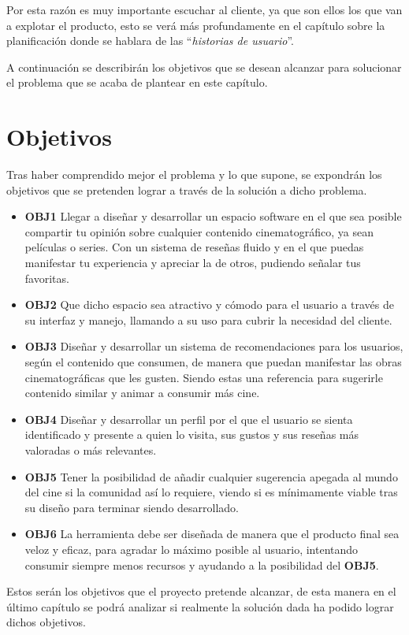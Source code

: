 Por esta razón es muy importante escuchar al cliente, ya que son ellos los que van a explotar el 
producto, esto se verá más profundamente en el capítulo sobre la planificación donde se hablara de las 
``\textit{historias de usuario}''.

A continuación se describirán los objetivos que se desean alcanzar para solucionar el problema que se 
acaba de plantear en este capítulo.

\section{Objetivos}

Tras haber comprendido mejor el problema y lo que supone, se expondrán los objetivos que se pretenden 
lograr a través de la solución a dicho problema.

\begin{itemize}
    \item \textbf{OBJ1} Llegar a diseñar y desarrollar un espacio software en el que sea posible 
    compartir tu opinión sobre cualquier contenido cinematográfico, ya sean películas o series. Con un 
    sistema de reseñas fluido y en el que puedas manifestar tu experiencia y apreciar la de otros, 
    pudiendo señalar tus favoritas.
    \item \textbf{OBJ2} Que dicho espacio sea atractivo y cómodo para el usuario a través de su interfaz 
    y manejo, llamando a su uso para cubrir la necesidad del cliente.
    \item \textbf{OBJ3} Diseñar y desarrollar un sistema de recomendaciones para los usuarios, según el 
    contenido que consumen, de manera que puedan manifestar las obras cinematográficas que les gusten. 
    Siendo estas una referencia para sugerirle contenido similar y animar a consumir más cine.
    \item \textbf{OBJ4} Diseñar y desarrollar un perfil por el que el usuario se sienta identificado y 
    presente a quien lo visita, sus gustos y sus reseñas más valoradas o más relevantes.
    \item \textbf{OBJ5} Tener la posibilidad de añadir cualquier sugerencia apegada al mundo del cine si 
    la comunidad así lo requiere, viendo si es mínimamente viable tras su diseño para terminar siendo 
    desarrollado.
    \item \textbf{OBJ6} La herramienta debe ser diseñada de manera que el producto final sea veloz y 
    eficaz, para agradar lo máximo posible al usuario, intentando consumir siempre menos recursos y 
    ayudando a la posibilidad del \textbf{OBJ5}.
\end{itemize}

Estos serán los objetivos que el proyecto pretende alcanzar, de esta manera en el último capítulo se 
podrá analizar si realmente la solución dada ha podido lograr dichos objetivos.